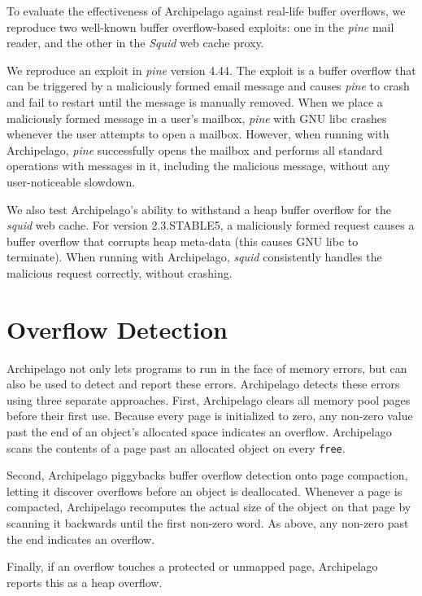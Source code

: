 \documentclass{acm_proc_article-sp}
\begin{document}
\noindent
To evaluate the effectiveness of Archipelago against real-life buffer
overflows, we reproduce two well-known buffer overflow-based exploits:
one in the \emph{pine} mail reader, and the other in the \emph{Squid}
web cache proxy.

We reproduce an exploit in \emph{pine} version 4.44. The exploit
is a buffer overflow that can be triggered by a maliciously formed
email message and causes \emph{pine} to crash and fail to restart
until the message is manually removed. When we place a maliciously
formed message in a user's mailbox, \emph{pine} with GNU libc crashes
whenever the user attempts to open a mailbox. However, when running
with Archipelago, \emph{pine} successfully opens the mailbox and
performs all standard operations with messages in it, including the
malicious message, without any user-noticeable slowdown.

We also test Archipelago's ability to withstand a heap buffer overflow for the
\emph{squid} web cache. For version 2.3.STABLE5, a maliciously formed request causes
a buffer overflow that corrupts heap meta-data (this causes GNU libc
to terminate). When running with Archipelago, \emph{squid}
consistently handles the malicious request correctly, without
crashing.


\section{Overflow Detection}
\label{sec:efence}

\noindent
Archipelago not only lets programs to run in the face of memory
errors, but can also be used to detect and report these
errors. Archipelago detects these errors using three separate
approaches. First, Archipelago clears all memory pool pages before
their first use. Because every page is initialized to zero, any
non-zero value past the end of an object's allocated space indicates
an overflow. Archipelago scans the contents of a page past an
allocated object on every {\tt free}.

Second, Archipelago piggybacks buffer overflow detection onto page
compaction, letting it discover overflows before an object is
deallocated. Whenever a page is compacted, Archipelago recomputes the
actual size of the object on that page by scanning it backwards until
the first non-zero word. As above, any non-zero past the end indicates
an overflow.

Finally, if an overflow touches a protected or unmapped page,
Archipelago reports this as a heap overflow.
\end{document}
